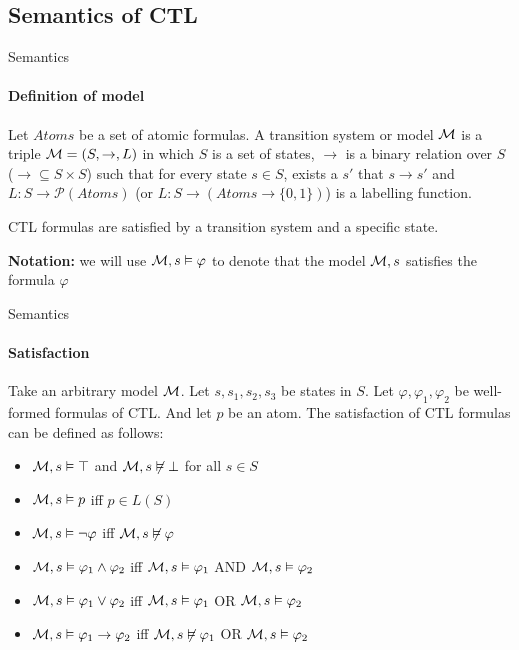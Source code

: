 \subsection{Semantics of CTL}
\begin{frame}{Semantics}
	\framesubtitle{Definition of model}
	\begin{definition}
		Let $Atoms$ be a set of atomic formulas. A \alert{transition system} or \alert{model} $\mathcal{M}$ is a triple $\mathcal{M} = (S, \to, L)$ in which $S$ is a set of states, $\to$ is a binary relation over $S$ ($\to \subseteq S\times S$) such that for every state $s\in S$, exists a $s'$ that $s \to s'$ and $L: S \to \mathcal{P}(Atoms)$ (or $L: S \to (Atoms \to \{0,1\})$) is a labelling function.
	\end{definition}\pause
    CTL formulas are satisfied by a transition system and a specific state.
    
	{\bf Notation:} we will use $\mathcal{M},s\vDash \varphi$ to denote that the model $\mathcal{M},s$ satisfies the formula $\varphi$
\end{frame}


\begin{frame}{Semantics}
	\framesubtitle{Satisfaction}
	Take an arbitrary model $\mathcal{M}$. Let $s, s_1, s_2, s_3$ be states in $S$. Let $\varphi, \varphi_1, \varphi_2$ be well-formed formulas of CTL. And let $p$ be an atom. The satisfaction of CTL formulas can be defined as follows:
	\begin{itemize}
		\item $\mathcal{M},s \vDash \top$ and $\mathcal{M},s \not\vDash \bot$ for all $s \in S$ \pause
		\item $\mathcal{M},s \vDash p$ iff $p \in L(S)$ \pause
		\item $\mathcal{M},s \vDash \neg\varphi$ iff $\mathcal{M},s \not\vDash \varphi$ \pause
		\item $\mathcal{M},s \vDash \varphi_1 \land \varphi_2$ iff $\mathcal{M},s \vDash \varphi_1$ AND $\mathcal{M},s \vDash \varphi_2$ \pause
		\item $\mathcal{M},s \vDash \varphi_1 \lor \varphi_2$ iff $\mathcal{M},s \vDash \varphi_1$ OR $\mathcal{M},s \vDash \varphi_2$ \pause
		\item $\mathcal{M},s \vDash \varphi_1 \to \varphi_2$ iff $\mathcal{M},s \not\vDash \varphi_1$ OR $\mathcal{M},s \vDash \varphi_2$
	\end{itemize}
\end{frame}

